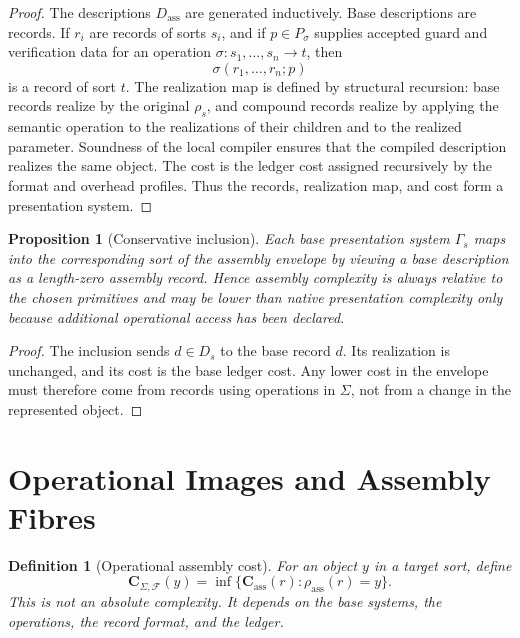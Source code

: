 \documentclass[11pt]{article}
\newtheorem{proposition}[theorem]{Proposition}
\newtheorem{definition}[theorem]{Definition}
\begin{document}
\begin{proof}
The descriptions \(D_{\operatorname{ass}}\) are generated inductively.  Base descriptions are records.  If \(r_i\) are records of sorts \(s_i\), and if \(p\in P_{\sigma}\) supplies accepted guard and verification data for an operation \(\sigma:s_1,\ldots,s_n\to t\), then
\[
\sigma(r_1,\ldots,r_n;p)
\]
is a record of sort \(t\).  The realization map is defined by structural recursion: base records realize by the original \(\rho_s\), and compound records realize by applying the semantic operation to the realizations of their children and to the realized parameter.  Soundness of the local compiler ensures that the compiled description realizes the same object.  The cost is the ledger cost assigned recursively by the format and overhead profiles.  Thus the records, realization map, and cost form a presentation system.
\end{proof}

\begin{proposition}[Conservative inclusion]
Each base presentation system \(\Gamma_s\) maps into the corresponding sort of the assembly envelope by viewing a base description as a length-zero assembly record.  Hence assembly complexity is always relative to the chosen primitives and may be lower than native presentation complexity only because additional operational access has been declared.
\end{proposition}

\begin{proof}
The inclusion sends \(d\in D_s\) to the base record \(d\).  Its realization is unchanged, and its cost is the base ledger cost.  Any lower cost in the envelope must therefore come from records using operations in \(\Sigma\), not from a change in the represented object.
\end{proof}

\section{Operational Images and Assembly Fibres}

\begin{definition}[Operational assembly cost]
For an object \(y\) in a target sort, define
\[
\mathbf C_{\Sigma,\mathcal F}(y)
=
\inf\{\mathbf C_{\operatorname{ass}}(r):\rho_{\operatorname{ass}}(r)=y\}.
\]
This is not an absolute complexity.  It depends on the base systems, the operations, the record format, and the ledger.
\end{definition}
\end{document}
